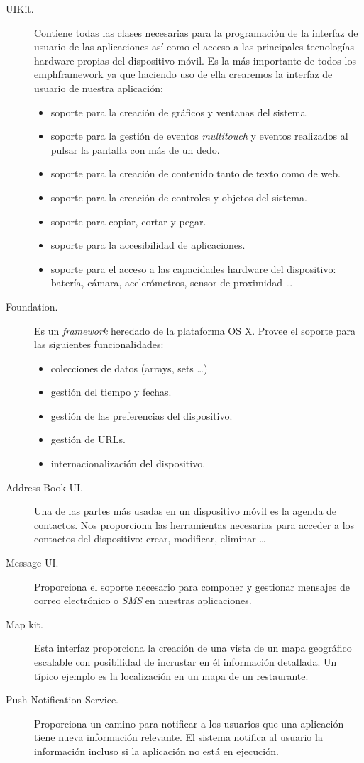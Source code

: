  \begin{description}
 	\item [UIKit.] Contiene todas las clases necesarias para la programación de la interfaz de usuario de las aplicaciones así como el acceso a las principales tecnologías hardware 
	 propias del dispositivo  móvil. Es la más importante de todos los emph{framework} ya que haciendo uso de ella crearemos la interfaz de usuario de nuestra aplicación:
		 \begin{itemize}
		  	\item soporte para la creación de gráficos y ventanas del sistema.
			\item soporte para la gestión de eventos \emph{multitouch} y eventos realizados al pulsar la pantalla con más de un dedo.
			 \item soporte para la creación de contenido tanto de texto como de web.
 			\item soporte para la creación de controles y objetos del sistema.
 			\item soporte para copiar, cortar y pegar.
 			\item soporte para la accesibilidad de aplicaciones.
 			\item soporte para el acceso a las capacidades hardware del dispositivo: batería, cámara, acelerómetros, sensor de proximidad \ldots 
 		\end{itemize}
 	 \item [Foundation.] Es un \emph{framework} heredado de la plataforma OS X. Provee el soporte para las siguientes funcionalidades: 
 		\begin{itemize}
			\item colecciones de datos (arrays, sets \ldots)
			\item gestión del tiempo y fechas.
			\item gestión de las preferencias del dispositivo.
			\item gestión de URLs.
			\item internacionalización del dispositivo.
		\end{itemize}
	\item [Address Book UI.] Una de las partes más usadas en un dispositivo móvil es la agenda de contactos. Nos proporciona las herramientas necesarias para acceder a los contactos del dispositivo: crear, modificar, eliminar \dots
	\item [Message UI.] Proporciona el soporte necesario para componer y gestionar mensajes de correo electrónico o \emph{SMS} en nuestras aplicaciones.
	\item [Map kit.]  Esta interfaz proporciona la creación de una vista de un mapa geográfico escalable con posibilidad de incrustar en él información detallada. Un típico ejemplo es la localización en un mapa de un restaurante.
	\item [Push Notification Service.] Proporciona un camino para notificar a los usuarios que una aplicación tiene nueva información relevante. El sistema notifica al usuario la información incluso si la aplicación no está en ejecución.

\end{description}

